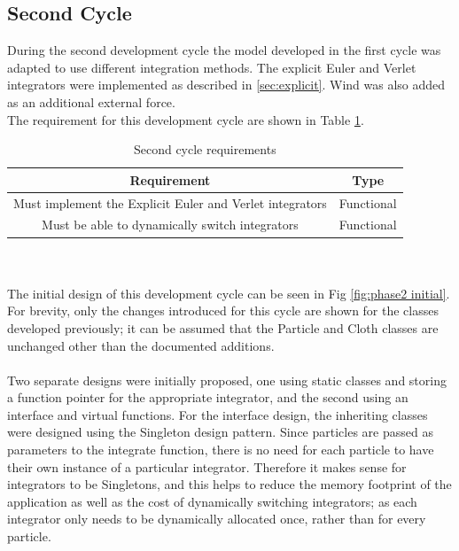 \subsection{Second Cycle}
During the second development cycle the model developed in the first cycle was adapted to use different integration methods. The explicit Euler and Verlet integrators were implemented as described in \ref{sec:explicit}. Wind was also added as an additional external force.
\\The requirement for this development cycle are shown in Table \ref{tab:cycle 2 require}.
\begin{table}[tp]
   \begin{minipage}{\textwidth}
      \begin{center}
         \begin{tabular}{c|c}
           Requirement & Type\\
           \hline
           Must implement the Explicit Euler and Verlet integrators& Functional\\
           Must be able to dynamically switch integrators & Functional\\
         \end{tabular}
      \end{center}
   \end{minipage}
   \caption{Second cycle requirements}
   \label{tab:cycle 2 require}
\end{table}
\\\\The initial design of this development cycle can be seen in Fig \ref{fig:phase2 initial}. For brevity, only the changes introduced for this cycle are shown for the classes developed previously; it can be assumed that the Particle and Cloth classes are unchanged other than the documented additions.
\\\\Two separate designs were initially proposed, one using static classes and storing a function pointer for the appropriate integrator, and the second using an interface and virtual functions. For the interface design, the inheriting classes were designed using the Singleton design pattern. Since particles are passed as parameters to the integrate function, there is no need for each particle to have their own instance of a particular integrator. Therefore it makes sense for integrators to be Singletons, and this helps to reduce the memory footprint of the application as well as the cost of dynamically switching integrators; as each integrator only needs to be dynamically allocated once, rather than for every particle.
